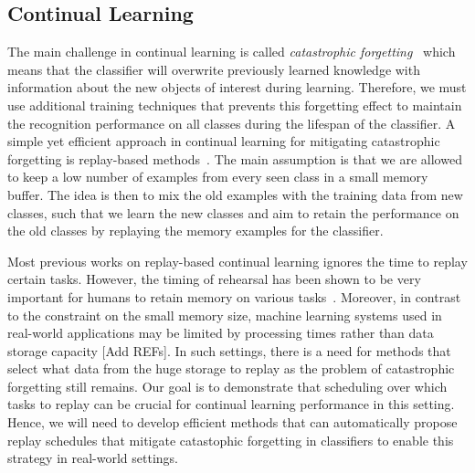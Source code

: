 \subsection{Continual Learning}

The main challenge in continual learning is called \textit{catastrophic forgetting}~\cite{mccloskey1989catastrophic} which means that the classifier will overwrite previously learned knowledge with information about the new objects of interest during learning. Therefore, we must use additional training techniques that prevents this forgetting effect to maintain the recognition performance on all classes during the lifespan of the classifier. A simple yet efficient approach in continual learning for mitigating catastrophic forgetting is replay-based methods~\cite{chaudhry2019tiny, hayes2021replay}. The main assumption is that we are allowed to keep a low number of examples from every seen class in a small memory buffer. The idea is then to mix the old examples with the training data from new classes, such that we learn the new classes and aim to retain the performance on the old classes by replaying the memory examples for the classifier. 

Most previous works on replay-based continual learning ignores the time to replay certain tasks. However, the timing of rehearsal has been shown to be very important for humans to retain memory on various tasks~\cite{dempster1989spacing, ebbinghaus2013memory, hawley2008comparison, landauer1978optimum, smolen2016right}. Moreover, in contrast to the constraint on the small memory size, machine learning systems used in real-world applications may be limited by processing times rather than data storage capacity [Add REFs]. In such settings, there is a need for methods that select what data from the huge storage to replay as the problem of catastrophic forgetting still remains. Our goal is to demonstrate that scheduling over which tasks to replay can be crucial for continual learning performance in this setting. Hence, we will need to develop efficient methods that can automatically propose replay schedules that mitigate catastophic forgetting in classifiers to enable this strategy in real-world settings. 



